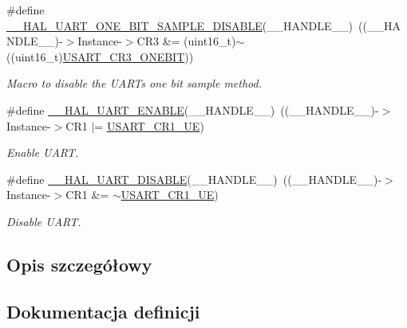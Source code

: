 \begin{DoxyCompactItemize}
\#define \hyperlink{group___u_a_r_t___exported___macros_ga2dbd7e6592e8c5999f817b69f0fd24bb}{\+\_\+\+\_\+\+H\+A\+L\+\_\+\+U\+A\+R\+T\+\_\+\+O\+N\+E\+\_\+\+B\+I\+T\+\_\+\+S\+A\+M\+P\+L\+E\+\_\+\+D\+I\+S\+A\+B\+LE}(\+\_\+\+\_\+\+H\+A\+N\+D\+L\+E\+\_\+\+\_\+)~((\+\_\+\+\_\+\+H\+A\+N\+D\+L\+E\+\_\+\+\_\+)-\/$>$Instance-\/$>$C\+R3 \&= (uint16\+\_\+t)$\sim$((uint16\+\_\+t)\hyperlink{group___peripheral___registers___bits___definition_ga9a96fb1a7beab602cbc8cb0393593826}{U\+S\+A\+R\+T\+\_\+\+C\+R3\+\_\+\+O\+N\+E\+B\+IT}))
\begin{DoxyCompactList}\small\item\em Macro to disable the U\+A\+RT\textquotesingle{}s one bit sample method. \end{DoxyCompactList}\item 
\#define \hyperlink{group___u_a_r_t___exported___macros_ga49eb5ea4996a957afeb8be2793ba3fe9}{\+\_\+\+\_\+\+H\+A\+L\+\_\+\+U\+A\+R\+T\+\_\+\+E\+N\+A\+B\+LE}(\+\_\+\+\_\+\+H\+A\+N\+D\+L\+E\+\_\+\+\_\+)~((\+\_\+\+\_\+\+H\+A\+N\+D\+L\+E\+\_\+\+\_\+)-\/$>$Instance-\/$>$C\+R1 $\vert$=  \hyperlink{group___peripheral___registers___bits___definition_ga2bb650676aaae4a5203f372d497d5947}{U\+S\+A\+R\+T\+\_\+\+C\+R1\+\_\+\+UE})
\begin{DoxyCompactList}\small\item\em Enable U\+A\+RT. \end{DoxyCompactList}\item 
\#define \hyperlink{group___u_a_r_t___exported___macros_gad2f9fbdb4adf3a09939e201eaeea072f}{\+\_\+\+\_\+\+H\+A\+L\+\_\+\+U\+A\+R\+T\+\_\+\+D\+I\+S\+A\+B\+LE}(\+\_\+\+\_\+\+H\+A\+N\+D\+L\+E\+\_\+\+\_\+)~((\+\_\+\+\_\+\+H\+A\+N\+D\+L\+E\+\_\+\+\_\+)-\/$>$Instance-\/$>$C\+R1 \&=  $\sim$\hyperlink{group___peripheral___registers___bits___definition_ga2bb650676aaae4a5203f372d497d5947}{U\+S\+A\+R\+T\+\_\+\+C\+R1\+\_\+\+UE})
\begin{DoxyCompactList}\small\item\em Disable U\+A\+RT. \end{DoxyCompactList}\end{DoxyCompactItemize}


\subsection{Opis szczegółowy}


\subsection{Dokumentacja definicji}
\mbox{\label{group___u_a_r_t___exported___macros_gae1dfc7777b089a10464841045b524caa}} 
